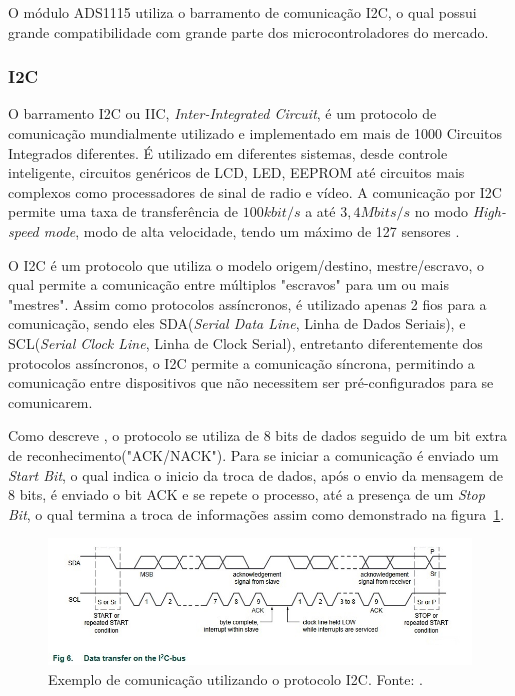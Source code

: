 O módulo ADS1115 utiliza o barramento de comunicação I2C, o qual possui grande compatibilidade com grande parte dos microcontroladores do mercado.

\subsubsection{I2C}

O barramento I2C ou IIC, \textit{Inter-Integrated Circuit}, é um protocolo de comunicação mundialmente utilizado e implementado em mais de 1000 Circuitos Integrados diferentes. É utilizado em diferentes sistemas, desde controle inteligente, circuitos genéricos de LCD, LED, EEPROM até circuitos mais complexos como processadores de sinal de radio e vídeo. A comunicação por I2C permite uma taxa de transferência de $100 kbit/s$ a até $3,4 Mbits/s$ no modo \textit{High-speed mode}, modo de alta velocidade, tendo um máximo de 127 sensores \cite{semiconductors2000i2c}.

O I2C é um protocolo que utiliza o modelo origem/destino, mestre/escravo, o qual permite a comunicação entre múltiplos "escravos" para um ou mais "mestres". Assim como protocolos assíncronos, é utilizado apenas 2 fios para a comunicação, sendo eles SDA(\textit{Serial Data Line}, Linha de Dados Seriais), e SCL(\textit{Serial Clock Line}, Linha de Clock Serial), entretanto diferentemente dos protocolos assíncronos, o I2C permite a comunicação síncrona, permitindo a comunicação entre dispositivos que não necessitem ser pré-configurados para se comunicarem.

Como descreve , o protocolo se utiliza de 8 bits de dados seguido de um bit extra de reconhecimento("ACK/NACK"). Para se iniciar a comunicação é enviado um \textit{Start Bit}, o qual indica o inicio da troca de dados, após o envio da mensagem de 8 bits, é enviado o bit ACK e se repete o processo, até a presença de um \textit{Stop Bit}, o qual termina a troca de informações assim como demonstrado na figura~\ref{fig:I2C1}.

\FloatBarrier
\begin{figure}[!htbp]
	\centering
	\includegraphics[scale=0.7]{imagens/I2C}
	\caption{Exemplo de comunicação utilizando o protocolo I2C. Fonte: \cite{semiconductors2000i2c}. }
	
	\label{fig:I2C1}
\end{figure}
\FloatBarrier


